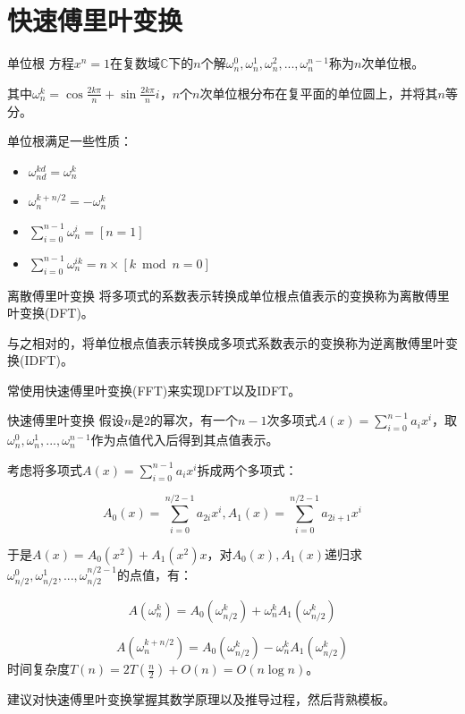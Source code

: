 \documentclass{beamer}
\begin{document}
	\section{快速傅里叶变换}
	\begin{frame}{单位根}
		方程$x^n=1$在复数域$\mathbb{C}$下的$n$个解$\omega_n^0, \omega_n^1, \omega_n^2,..., \omega_n^{n-1}$称为$n$次单位根。
		
		其中$\omega_n^k=\cos\frac{2k\pi}{n}+\sin\frac{2k\pi}{n}i$，$n$个$n$次单位根分布在复平面的单位圆上，并将其$n$等分。
		
		单位根满足一些性质：
		
		\begin{itemize}
			\item $\omega_{nd}^{kd}=\omega_n^k$
			\item $\omega_n^{k+n/2}=-\omega_{n}^k$
			\item $\sum\limits_{i=0}^{n-1}\omega_n^i=[n = 1]$
			\item $\sum\limits_{i=0}^{n-1}\omega_n^{ik}=n \times [k \bmod n = 0]$
		\end{itemize}
	\end{frame}
	\begin{frame}{离散傅里叶变换}
		将多项式的系数表示转换成单位根点值表示的变换称为离散傅里叶变换(DFT)。
		
		与之相对的，将单位根点值表示转换成多项式系数表示的变换称为逆离散傅里叶变换(IDFT)。
		
		常使用快速傅里叶变换(FFT)来实现DFT以及IDFT。
	\end{frame}
	\begin{frame}{快速傅里叶变换}
		假设$n$是$2$的幂次，有一个$n-1$次多项式$A(x)=\sum\limits_{i=0}^{n-1}a_ix^i$，取$\omega_n^0, \omega_n^1, ..., \omega_n^{n-1}$作为点值代入后得到其点值表示。
		
		考虑将多项式$A(x)=\sum\limits_{i=0}^{n-1}a_ix^i$拆成两个多项式：
		
		$$A_0(x)=\sum_{i=0}^{n/2-1}a_{2i}x^i,A_1(x)=\sum_{i=0}^{n/2-1}a_{2i+1}x^i$$
		
		于是$A(x)=A_0(x^2)+A_1(x^2)x$，对$A_0(x),A_1(x)$递归求$\omega_{n/2}^0, \omega_{n/2}^1, ..., \omega_{n/2}^{{n/2}-1}$的点值，有：
		
		$$A(\omega_n^k)=A_0(\omega_{n/2}^k)+\omega_n^kA_1(\omega_{n/2}^k)$$
		
		$$A(\omega_n^{k+n/2})=A_0(\omega_{n/2}^k)-\omega_n^kA_1(\omega_{n/2}^k)$$
		时间复杂度$T(n)=2T(\frac n2)+O(n)=O(n\log n)$。
		
		建议对快速傅里叶变换掌握其数学原理以及推导过程，然后背熟模板。
		
	\end{frame}
\end{document}
